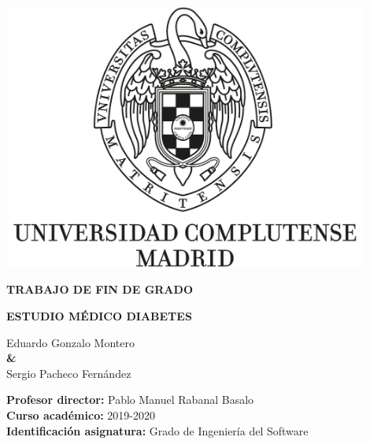 \documentclass{report}
\begin{document}
    \begin{titlepage}
        \centering
        {\includegraphics[width=0.9\textwidth]{images/logo_UCM}}
    
        \vspace{1.5cm}
        
        {\huge\textbf{TRABAJO DE FIN DE GRADO \\ }  }

        \vspace{0.5cm}
        
        {\huge\textbf{ESTUDIO MÉDICO DIABETES}  }
        
        \vspace{2.3cm}
    
        {\Large Eduardo Gonzalo Montero \\}
        \vspace{0.5cm}
        {\textbf \& \\}
        \vspace{0.5cm}
        {\Large Sergio Pacheco Fernández \\}
        
        \vspace{2.3cm}
        
        \raggedright
        {\Large \textbf{Profesor director:} Pablo Manuel Rabanal Basalo \\}
        \vspace{0.1cm}
        {\Large\textbf {Curso académico:} 2019-2020 \\}
        \vspace{0.1cm}
        {\Large\textbf {Identificación asignatura: }Grado de Ingeniería del Software \\}
   

\end{titlepage}
\end{document}
